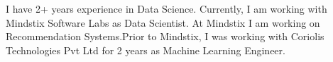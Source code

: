 
\begin{cvparagraph}
I have 2+ years experience in Data Science. Currently, I am working with Mindstix Software Labs as Data Scientist. At Mindstix I am working on Recommendation Systems.\newline Prior to Mindstix, I was working with Coriolis Technologies Pvt Ltd for 2 years as Machine Learning Engineer.
\end{cvparagraph}
